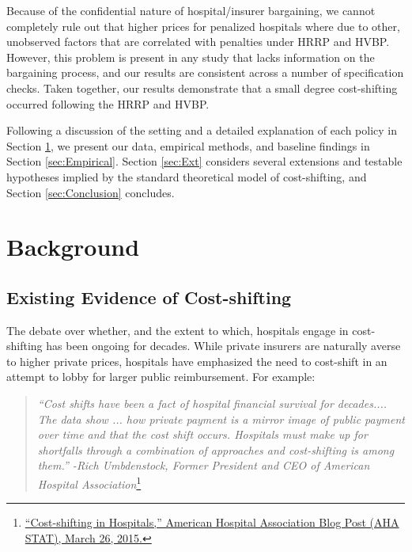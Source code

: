 \documentclass[12pt]{article}
\begin{document}
Because of the confidential nature of hospital/insurer bargaining, we cannot completely rule out that higher prices for penalized hospitals where due to other, unobserved factors that are correlated with penalties under HRRP and HVBP.  However, this problem is present in any study that lacks information on the bargaining process, and our results are consistent across a number of specification checks. Taken together, our results demonstrate that a small degree cost-shifting occurred following the HRRP and HVBP.

Following a discussion of the setting and a detailed explanation of each policy in Section \ref{sec:Background}, we present our data, empirical methods, and baseline findings in Section \ref{sec:Empirical}. Section \ref{sec:Ext} considers several extensions and testable hypotheses implied by the standard theoretical model of cost-shifting, and Section \ref{sec:Conclusion} concludes.

\section{Background}
\label{sec:Background}

\subsection{Existing Evidence of Cost-shifting}
The debate over whether, and the extent to which, hospitals engage in cost-shifting has been ongoing for decades. While private insurers are naturally averse to higher private prices, hospitals have emphasized the need to cost-shift in an attempt to lobby for larger public reimbursement. For example:
\begin{quote}
\textit{``Cost shifts have been a fact of hospital financial survival for decades.... The data show ...  how private payment is a mirror image of public payment over time and that the cost shift occurs. Hospitals must make up for shortfalls through a combination of approaches and cost-shifting is among them.'' -Rich Umbdenstock, Former President and CEO of American Hospital Association}\footnote{\href{http://blog.aha.org/post/costshifting-in-hospitals-}{``Cost-shifting in Hospitals,'' American Hospital Association Blog Post (AHA STAT), March 26, 2015.}}
\end{quote}
\end{document}
